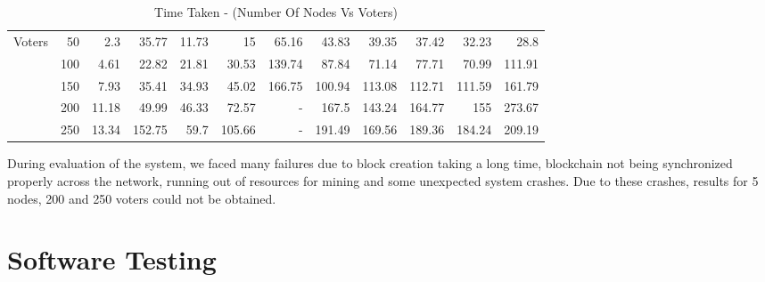 \documentclass[oneside, 12pt]{book}
\begin{document}
\begin{table}[H]
{\begin{tabular}{|cr|rrrrrrrrrr|}
						\multicolumn{1}{|c|}{Voters}            & 50  & \multicolumn{1}{r|}{2.3}   & \multicolumn{1}{r|}{35.77}  & \multicolumn{1}{r|}{11.73} & \multicolumn{1}{r|}{15}     & \multicolumn{1}{r|}{65.16}  & \multicolumn{1}{r|}{43.83}  & \multicolumn{1}{r|}{39.35}  & \multicolumn{1}{r|}{37.42}  & \multicolumn{1}{r|}{32.23}  & 28.8   \\ \cline{2-12} 
						\multicolumn{1}{|c|}{\multirow{4}{*}{}} & 100 & \multicolumn{1}{r|}{4.61}  & \multicolumn{1}{r|}{22.82}  & \multicolumn{1}{r|}{21.81} & \multicolumn{1}{r|}{30.53}  & \multicolumn{1}{r|}{139.74} & \multicolumn{1}{r|}{87.84}  & \multicolumn{1}{r|}{71.14}  & \multicolumn{1}{r|}{77.71}  & \multicolumn{1}{r|}{70.99}  & 111.91 \\ \cline{2-12} 
						\multicolumn{1}{|c|}{}                  & 150 & \multicolumn{1}{r|}{7.93}  & \multicolumn{1}{r|}{35.41}  & \multicolumn{1}{r|}{34.93} & \multicolumn{1}{r|}{45.02}  & \multicolumn{1}{r|}{166.75} & \multicolumn{1}{r|}{100.94} & \multicolumn{1}{r|}{113.08} & \multicolumn{1}{r|}{112.71} & \multicolumn{1}{r|}{111.59} & 161.79 \\ \cline{2-12} 
						\multicolumn{1}{|c|}{}                  & 200 & \multicolumn{1}{r|}{11.18} & \multicolumn{1}{r|}{49.99}  & \multicolumn{1}{r|}{46.33} & \multicolumn{1}{r|}{72.57}  & \multicolumn{1}{r|}{-}      & \multicolumn{1}{r|}{167.5}  & \multicolumn{1}{r|}{143.24} & \multicolumn{1}{r|}{164.77} & \multicolumn{1}{r|}{155}    & 273.67 \\ \cline{2-12} 
						\multicolumn{1}{|c|}{}                  & 250 & \multicolumn{1}{r|}{13.34} & \multicolumn{1}{r|}{152.75} & \multicolumn{1}{r|}{59.7}  & \multicolumn{1}{r|}{105.66} & \multicolumn{1}{r|}{-}      & \multicolumn{1}{r|}{191.49} & \multicolumn{1}{r|}{169.56} & \multicolumn{1}{r|}{189.36} & \multicolumn{1}{r|}{184.24} & 209.19 \\ \hline
					\end{tabular}%
				}
				\caption{Time Taken - (Number Of Nodes Vs Voters)}
				\label{tab:result-table}
			\end{table}
			During evaluation of the system, we faced many failures due to block creation taking a long time, blockchain not being synchronized properly across the network, running out of resources for mining and some unexpected system crashes. Due to these crashes, results for 5 nodes, 200 and 250 voters could not be obtained.
	\newpage
	\section{Software Testing}
	\newpage
\end{document}
